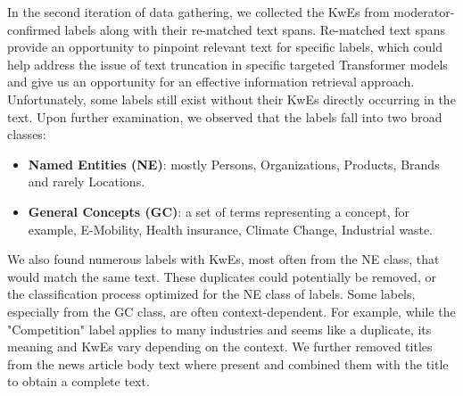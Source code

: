 \renewcommand{\arraystretch}{1.5}
\begin{table}[htb]
    \caption{Examples of simplified Keyword-Boolean Expressions}
	\label{tab:frames}
	\centering
\end{table}
In the second iteration of data gathering, we collected the KwEs from moderator-confirmed labels along with their re-matched text spans.
Re-matched text spans provide an opportunity to pinpoint relevant text for specific labels, which could help address the issue of text truncation in specific targeted Transformer models and give us an opportunity for an effective information retrieval approach. 
Unfortunately, some labels still exist without their KwEs directly occurring in the text.
Upon further examination, we observed that the labels fall into two broad classes:
\begin{itemize}
  \item \textbf{Named Entities (NE)}: mostly Persons, Organizations, Products, Brands and rarely Locations.
  \item \textbf{General Concepts (GC)}: a set of terms representing a concept, for example, E-Mobility, Health insurance, Climate Change, Industrial waste.
\end{itemize}
We also found numerous labels with KwEs, most often from the NE class, that would match the same text.
These duplicates could potentially be removed, or the classification process optimized for the NE class of labels.
Some labels, especially from the GC class, are often context-dependent. 
For example, while the "Competition" label applies to many industries and seems like a duplicate, its meaning and KwEs vary depending on the context.
We further removed titles from the news article body text where present and combined them with the title to obtain a complete text.

